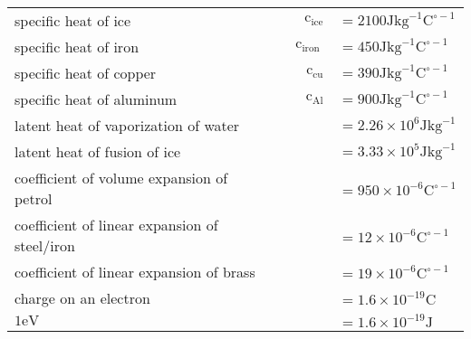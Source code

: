 \documentclass{extarticle}
\begin{document}
\begin{tcolorbox}[enhanced jigsaw,sharp corners,coltext=black,colback=BurntOrange!25!white,boxrule=pt,breakable,size=minimal]
\begin{tabu}{lrl}
specific heat of ice & $\quad \mathrm{c}_{\mathrm{ice}}$ & $=2100 \mathrm{J} \mathrm{kg}^{-1} \mathrm{C}^{\circ-1}$ \\

specific heat of iron & $\quad \mathrm{c}_{\text {iron }}$ & $=450 \mathrm{J} \mathrm{kg}^{-1} \mathrm{C}^{\circ-1}$ \\

specific heat of copper & $\mathrm{c}_{\mathrm{cu}}$ & $=390 \mathrm{J} \mathrm{kg}^{-1} \mathrm{C}^{\circ-1}$ \\

specific heat of aluminum & $\mathrm{c}_{\mathrm{Al}}$ & $=900 \mathrm{J} \mathrm{kg}^{-1} \mathrm{C}^{\circ-1}$ \\

latent heat of vaporization of water & & $=2.26 \times 10^{6} \mathrm{J} \mathrm{kg}^{-1}$ \\

latent heat of fusion of ice & & $=3.33 \times 10^{5} \mathrm{J} \mathrm{kg}^{-1}$ \\

coefficient of volume expansion of petrol & & $=950 \times 10^{-6} \mathrm{C}^{\circ-1}$ \\

coefficient of linear expansion of steel/iron & & $=12 \times 10^{-6} \mathrm{C}^{\circ-1}$ \\

coefficient of linear expansion of brass & & $=19 \times 10^{-6} \mathrm{C}^{\circ-1}$ \\

charge on an electron & & $=1.6 \times 10^{-19} \mathrm{C}$ \\

$1 \mathrm{eV}$ & & $=1.6 \times 10^{-19} \mathrm{J}$ \\

\end{tabu}


\end{tcolorbox}
\end{document}
